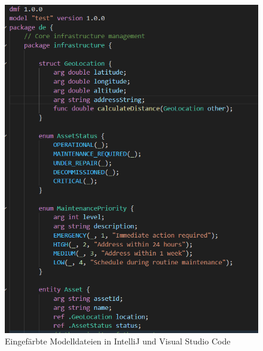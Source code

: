 \documentclass[./einleitung.tex]{subfiles}
\begin{document}
\begin{figure}[H]
        \includegraphics[width=\linewidth / 2 - 1em]{bilder/semanticVscode}
        \caption{Eingefärbte Modelldateien in IntelliJ und Visual Studio Code}
        \label{fig:semanticintellij}
    \end{figure}
\end{document}
